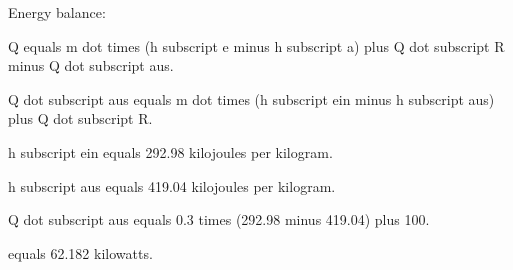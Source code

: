 Energy balance:

Q equals m dot times (h subscript e minus h subscript a) plus Q dot subscript R minus Q dot subscript aus.

Q dot subscript aus equals m dot times (h subscript ein minus h subscript aus) plus Q dot subscript R.

h subscript ein equals 292.98 kilojoules per kilogram.

h subscript aus equals 419.04 kilojoules per kilogram.

Q dot subscript aus equals 0.3 times (292.98 minus 419.04) plus 100.

equals 62.182 kilowatts.